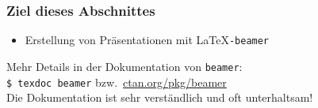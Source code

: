 
\subtitle{Präsentationen}
\date{2017-05-29}



\begin{frame}[label=ziel]
  \frametitle{Ziel dieses Abschnittes}

  \onslide<+->
  \begin{itemize}
  \item Erstellung von Präsentationen mit \LaTeX\texttt{-beamer}
  \end{itemize}

  \onslide<+->

  \bigskip

  Mehr Details in der Dokumentation von \texttt{beamer}:\\
  \vspace*{\baselineskip}
  \qquad\texttt{\$ texdoc beamer} bzw.\ \url{ctan.org/pkg/beamer}\\
  \vspace*{\baselineskip}
  Die Dokumentation ist sehr verständlich und oft unterhaltsam!

\end{frame}





